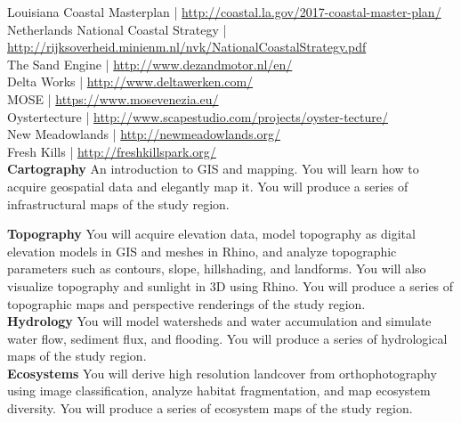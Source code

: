 \documentclass[11pt,article,oneside]{memoir}
\begin{document}
\noindent
Louisiana Coastal Masterplan | \url{http://coastal.la.gov/2017-coastal-master-plan/}\\
Netherlands National Coastal Strategy | \\
\url{http://rijksoverheid.minienm.nl/nvk/NationalCoastalStrategy.pdf}\\
The Sand Engine | \url{http://www.dezandmotor.nl/en/}\\
Delta Works | \url{http://www.deltawerken.com/}\\
MOSE | \url{https://www.mosevenezia.eu/}\\
Oystertecture | \url{http://www.scapestudio.com/projects/oyster-tecture/}\\
New Meadowlands | \url{http://newmeadowlands.org/}\\
Fresh Kills | \url{http://freshkillspark.org/}\\

\noindent \textbf{Cartography}
An introduction to GIS and mapping. 
You will learn how to acquire geospatial data and elegantly map it.
You will produce a series of infrastructural maps of the study region. 
%
\nocite{*} \printbibliography[keyword=cartography, heading=none]
\vspace*{0.5em}

\noindent \textbf{Topography} 
You will acquire elevation data, 
model topography as digital elevation models in GIS 
and meshes in Rhino,
and analyze topographic parameters 
such as contours, slope, hillshading, and landforms.
You will also visualize topography and sunlight in 3D using Rhino.
You will produce a series of topographic maps 
and perspective renderings of the study region.\\

\noindent \textbf{Hydrology} 
You will model watersheds and water accumulation 
and simulate water flow, sediment flux, and flooding. 
You will produce a series of hydrological maps of the study region.\\

\noindent \textbf{Ecosystems}
You will derive high resolution landcover 
from orthophotography using image classification, 
analyze habitat fragmentation, and map ecosystem diversity.
You will produce a series of ecosystem maps of the study region.\\
\end{document}
